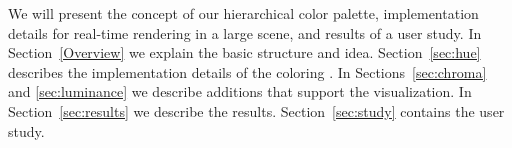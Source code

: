 \documentclass[review,journal]{vgtc}         %
\begin{document}
	We will present the concept of our hierarchical color palette, implementation details for real-time rendering in a large scene, and results of a user study.
	In Section~\ref{Overview} we explain the basic structure and idea.
	Section~\ref{sec:hue} describes the implementation details of the coloring .
	In Sections~\ref{sec:chroma} and \ref{sec:luminance} we describe additions that support the visualization.
	In Section~\ref{sec:results} we describe the results.
	Section~\ref{sec:study} contains the user study.
	
	
	
	
	
\end{document}
